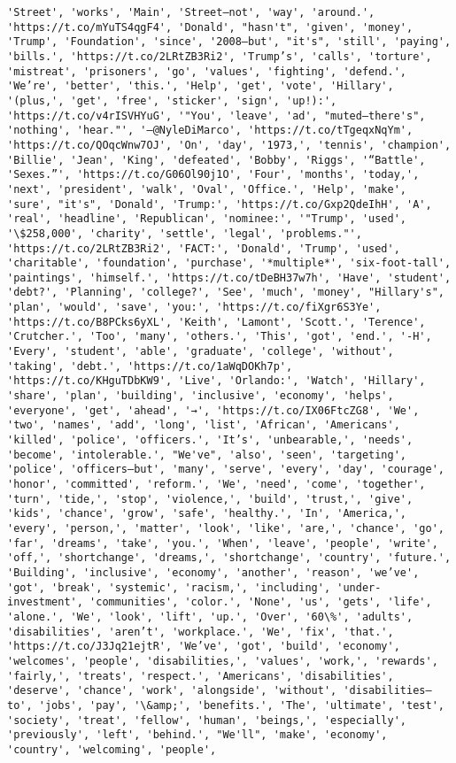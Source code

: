 \documentclass[11pt]{article}
\begin{document}
\begin{Verbatim}[commandchars=\\\{\}]
'Street', 'works', 'Main', 'Street—not', 'way', 'around.', 'https://t.co/mYuTS4qgF4', 'Donald', "hasn't", 'given', 'money', 'Trump', 'Foundation', 'since', '2008—but', "it's", 'still', 'paying', 'bills.', 'https://t.co/2LRtZB3Ri2', 'Trump’s', 'calls', 'torture', 'mistreat', 'prisoners', 'go', 'values', 'fighting', 'defend.', 'We’re', 'better', 'this.', 'Help', 'get', 'vote', 'Hillary', '(plus,', 'get', 'free', 'sticker', 'sign', 'up!):', 'https://t.co/v4rISVHYuG', '"You', 'leave', 'ad', "muted—there's", 'nothing', 'hear."', '—@NyleDiMarco', 'https://t.co/tTgeqxNqYm', 'https://t.co/QOqcWnw7OJ', 'On', 'day', '1973,', 'tennis', 'champion', 'Billie', 'Jean', 'King', 'defeated', 'Bobby', 'Riggs', '“Battle', 'Sexes.”', 'https://t.co/G06Ol90j1O', 'Four', 'months', 'today,', 'next', 'president', 'walk', 'Oval', 'Office.', 'Help', 'make', 'sure', "it's", 'Donald', 'Trump:', 'https://t.co/Gxp2QdeIhH', 'A', 'real', 'headline', 'Republican', 'nominee:', '"Trump', 'used', '\$258,000', 'charity', 'settle', 'legal', 'problems."', 'https://t.co/2LRtZB3Ri2', 'FACT:', 'Donald', 'Trump', 'used', 'charitable', 'foundation', 'purchase', '*multiple*', 'six-foot-tall', 'paintings', 'himself.', 'https://t.co/tDeBH37w7h', 'Have', 'student', 'debt?', 'Planning', 'college?', 'See', 'much', 'money', "Hillary's", 'plan', 'would', 'save', 'you:', 'https://t.co/fiXgr6S3Ye', 'https://t.co/B8PCks6yXL', 'Keith', 'Lamont', 'Scott.', 'Terence', 'Crutcher.', 'Too', 'many', 'others.', 'This', 'got', 'end.', '-H', 'Every', 'student', 'able', 'graduate', 'college', 'without', 'taking', 'debt.', 'https://t.co/1aWqDOKh7p', 'https://t.co/KHguTDbKW9', 'Live', 'Orlando:', 'Watch', 'Hillary', 'share', 'plan', 'building', 'inclusive', 'economy', 'helps', 'everyone', 'get', 'ahead', '→', 'https://t.co/IX06FtcZG8', 'We', 'two', 'names', 'add', 'long', 'list', 'African', 'Americans', 'killed', 'police', 'officers.', 'It’s', 'unbearable,', 'needs', 'become', 'intolerable.', "We've", 'also', 'seen', 'targeting', 'police', 'officers—but', 'many', 'serve', 'every', 'day', 'courage', 'honor', 'committed', 'reform.', 'We', 'need', 'come', 'together', 'turn', 'tide,', 'stop', 'violence,', 'build', 'trust,', 'give', 'kids', 'chance', 'grow', 'safe', 'healthy.', 'In', 'America,', 'every', 'person,', 'matter', 'look', 'like', 'are,', 'chance', 'go', 'far', 'dreams', 'take', 'you.', 'When', 'leave', 'people', 'write', 'off,', 'shortchange', 'dreams,', 'shortchange', 'country', 'future.', 'Building', 'inclusive', 'economy', 'another', 'reason', 'we’ve', 'got', 'break', 'systemic', 'racism,', 'including', 'under-investment', 'communities', 'color.', 'None', 'us', 'gets', 'life', 'alone.', 'We', 'look', 'lift', 'up.', 'Over', '60\%', 'adults', 'disabilities', 'aren’t', 'workplace.', 'We', 'fix', 'that.', 'https://t.co/J3Jq21ejtR', 'We’ve', 'got', 'build', 'economy', 'welcomes', 'people', 'disabilities,', 'values', 'work,', 'rewards', 'fairly,', 'treats', 'respect.', 'Americans', 'disabilities', 'deserve', 'chance', 'work', 'alongside', 'without', 'disabilities—to', 'jobs', 'pay', '\&amp;', 'benefits.', 'The', 'ultimate', 'test', 'society', 'treat', 'fellow', 'human', 'beings,', 'especially', 'previously', 'left', 'behind.', "We'll", 'make', 'economy', 'country', 'welcoming', 'people', 
\end{Verbatim}
\end{document}
